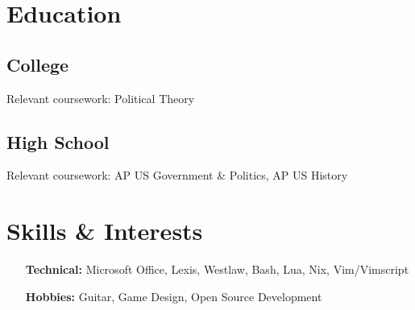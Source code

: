 \documentclass[letterpaper]{resume-shreeram}
\begin{document}
\section{Education}

\subsection{College}

\begin{compactitem}
  \item Relevant coursework: Political Theory
\end{compactitem}

\subsection{High School}

\begin{compactitem}
  \item Relevant coursework: AP US Government \& Politics, AP US
    History
\end{compactitem}


\section{Skills \& Interests}

\begin{itemize}
  \item[\bfseries Technical:] Microsoft Office, Lexis, Westlaw, Bash,
    Lua, Nix, Vim/Vimscript

  \item[\bfseries Hobbies:] Guitar, Game Design, Open Source Development

\end{itemize}
\end{document}
